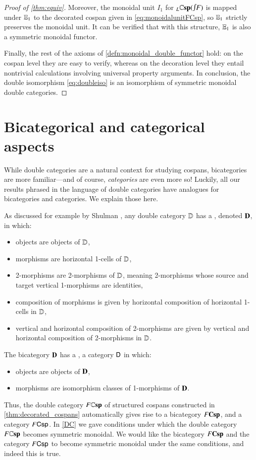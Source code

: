 \documentclass[reqno]{amsart}
\begin{document}
\begin{proof}[Proof of \cref{thm:equiv}]
Moreover, the monoidal unit $I_1$ for ${}_L \lCsp(\inta F)$ is mapped under $\mathbf{\mathbb E}_1$ to the decorated cospan given in \cref{eq:monoidalunitFCsp}, so $\mathbf{\mathbb E}_1$ strictly preserves the monoidal unit.
It can be verified that with this structure, $\mathbf{\mathbb E}_1$ is also a symmetric monoidal functor. 

Finally, the rest of the axioms of \cref{defn:monoidal_double_functor} hold: on the cospan level they are easy to verify, whereas on the decoration level they entail nontrivial calculations involving universal property arguments. In conclusion, the double isomorphism \cref{eq:doubleiso} is an isomorphism of symmetric monoidal double categories. 
\end{proof}

\section{Bicategorical and categorical aspects}
\label{spinoffs}

While double categories are a natural context for studying cospans, bicategories are more 
familiar---and of course, \emph{categories} are even more so!   Luckily, all our results 
phrased in the language of double categories have analogues for bicategories and categories.  
We explain those here.

As discussed for example by Shulman \cite{Shulman2010}, any double category $\mathbf{\mathbb D}$ has a 
, denoted $\mathbf{D}$, in which:
\begin{itemize}
\item objects are objects of $\mathbf{\mathbb D}$,
\item morphisms are horizontal 1-cells of $\mathbf{\mathbb D}$,
\item 2-morphisms are  2-morphisms of $\mathbf{\mathbb D}$, meaning 2-morphisms whose source and target vertical 1-morphisms are identities,
\item composition of morphisms is given by horizontal composition of horizontal 1-cells in $\mathbf{\mathbb D}$,
\item vertical and horizontal composition of 2-morphisms are given by vertical and horizontal
composition of 2-morphisms in $\mathbf{\mathbb D}$.
\end{itemize}
The bicategory $\mathbf{D}$ has a , a category $\mathsf{D}$ in which:
\begin{itemize}
\item objects are objects of $\mathbf{D}$,
\item morphisms are isomorphism classes of 1-morphisms of $\mathbf{D}$.   
\end{itemize}
Thus, the double category $F\mathbf{\mathbb Csp}$ of structured cospans constructed in \cref{thm:decorated_cospans} automatically gives rise to a bicategory $F\mathbf{Csp}$, and a category $F\mathsf{Csp}$.   In \cref{DC} we gave conditions under which the double category $F\mathbf{\mathbb Csp}$ becomes symmetric monoidal.   We would like the bicategory $F\mathbf{Csp}$ and the category $F\mathsf{Csp}$ to become symmetric monoidal under the same conditions, and indeed this is true.   
\end{document}
